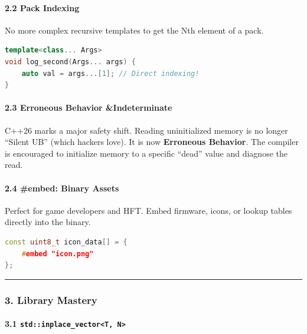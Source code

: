 \hypertarget{pack-indexing}{%
\paragraph{2.2 Pack Indexing}\label{pack-indexing}}

No more complex recursive templates to get the Nth element of a pack.

\begin{lstlisting}[language={C++}]
template<class... Args>
void log_second(Args... args) {
    auto val = args...[1]; // Direct indexing!
}
\end{lstlisting}

\hypertarget{erroneous-behavior-indeterminate}{%
\paragraph{2.3 Erroneous Behavior
\&Indeterminate}\label{erroneous-behavior-indeterminate}}

C++26 marks a major safety shift. Reading uninitialized memory is no
longer ``Silent UB'' (which hackers love). It is now \textbf{Erroneous
Behavior}. The compiler is encouraged to initialize memory to a specific
``dead'' value and diagnose the read.

\hypertarget{embed-binary-assets}{%
\paragraph{2.4 \#embed: Binary Assets}\label{embed-binary-assets}}

Perfect for game developers and HFT. Embed firmware, icons, or lookup
tables directly into the binary.

\begin{lstlisting}[language={C++}]
const uint8_t icon_data[] = {
    #embed "icon.png"
};
\end{lstlisting}

\begin{center}\rule{0.5\linewidth}{0.5pt}\end{center}

\hypertarget{library-mastery}{%
\subsubsection{3. Library Mastery}\label{library-mastery}}

\hypertarget{stdinplace_vectort-n}{%
\paragraph{\texorpdfstring{3.1
\texttt{std::inplace\_vector\textless{}T,\ N\textgreater{}}}{3.1 std::inplace\_vector\textless T, N\textgreater{}}}\label{stdinplace_vectort-n}}

